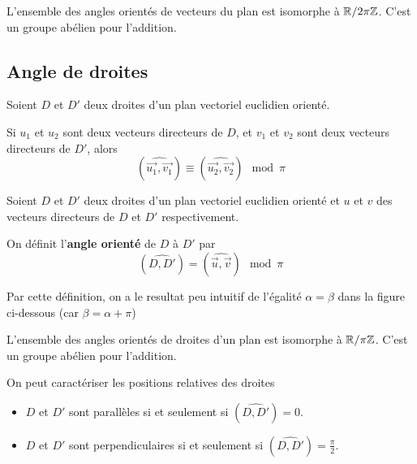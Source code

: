 \documentclass[a4paper,12pt]{article}
\begin{document}
\begin{remarque}
    L'ensemble des angles orientés de vecteurs du plan est isomorphe à $\mathbb{R} / 2\pi\mathbb{Z}$.
    C'est un groupe abélien pour l'addition.
\end{remarque}

\subsection{Angle de droites}

\begin{proposition}{}{}
    Soient $D$ et $D'$ deux droites d'un plan vectoriel euclidien orienté.

    Si $u_1$ et $u_2$ sont deux vecteurs directeurs de $D$, et $v_1$ et $v_2$ sont deux vecteurs directeurs de $D'$, alors
    $$
    (\widehat{\overrightarrow{u_1}, \overrightarrow{v_1}}) \equiv (\widehat{\overrightarrow{u_2}, \overrightarrow{v_2}}) \mod \pi
    $$
\end{proposition}

\begin{definition}
    Soient $D$ et $D'$ deux droites d'un plan vectoriel euclidien orienté et $u$ et $v$ des vecteurs directeurs de $D$ et $D'$ respectivement.

    On définit l'\textbf{angle orienté} de $D$ à $D'$ par
    $$
    (\widehat{D, D'}) = (\widehat{\overrightarrow{u}, \overrightarrow{v}}) \mod \pi
    $$
\end{definition}

\begin{remarque}
    Par cette définition, on a le resultat peu intuitif de l'égalité $\alpha = \beta$ dans la figure ci-dessous (car $\beta = \alpha + \pi$)
\end{remarque}

\tikzexternalenable
\begin{figure}[H]
    \centering
    \resizebox{0.6\textwidth}{!}{%
    
    }
\end{figure}
\tikzexternaldisable

\begin{remarque}
    L'ensemble des angles orientés de droites d'un plan est isomorphe à $\mathbb{R} / \pi\mathbb{Z}$.
    C'est un groupe abélien pour l'addition.
\end{remarque}

\begin{remarque}
    On peut caractériser les positions relatives des droites
    \begin{itemize}
        \item $D$ et $D'$ sont parallèles si et seulement si $(\widehat{D, D'}) = 0$.
        \item $D$ et $D'$ sont perpendiculaires si et seulement si $(\widehat{D, D'}) = \frac{\pi}{2}$.
    \end{itemize}
\end{remarque}
\end{document}
